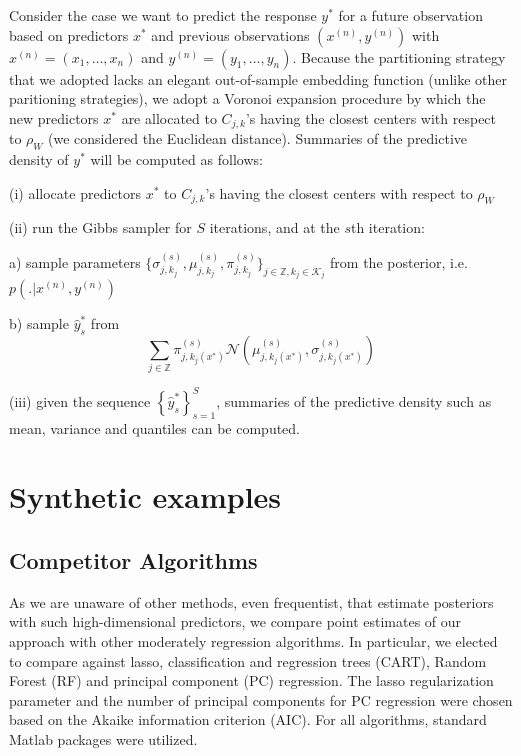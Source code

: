\documentclass{article} %
\providecommand{\mc}[1]{\mathcal{#1}}
\newcommand{\ZZ}{\mathbb{Z}}
\begin{document}
Consider the case we want to predict the response $y^{*}$ for a future observation based on predictors $x^{*}$ and previous observations $(x^{(n)},y^{(n)})$ with $x^{(n)}=(x_1,  \ldots, x_n)$ and $y^{(n)}=(y_1,  \ldots, y_n)$. Because the partitioning strategy that we adopted lacks an elegant out-of-sample embedding function (unlike other paritioning strategies), we adopt a Voronoi expansion procedure by which  the new predictors $x^{*}$ are allocated to $C_{j,k}$'s having the closest centers with respect to $\rho_W$ (we considered the Euclidean distance). Summaries of the predictive density of $y^{*}$ will be computed as follows:

(i) allocate predictors $x^{*}$ to $C_{j,k}$'s having the closest centers with respect to $\rho_W$

(ii) run the Gibbs sampler for $S$ iterations, and at the $s$th  iteration:

 \hspace{5pt} a) sample parameters $\{\sigma^{(s)}_{j,k_j}, \mu^{(s)}_{j,k_j}, \pi^{(s)}_{j,k_j} \}_{j\in\ZZ,k_j \in\mc{K}_j}$ from the posterior, i.e.  $p(.| x^{(n)},y^{(n)})$
   
 \hspace{5pt}   b) sample $\hat{y}^*_{s}$ from 
 $$ \sum_{j \in \ZZ} \pi^{(s)}_{j,k_j(x^{*})} \mc{N}\left(\mu^{(s)}_{j,k_j(x^{*})},\sigma^{(s)}_{j,k_j(x^{*})}\right)$$
   
 (iii) given the sequence $\left\lbrace  \hat{y}^*_{s}\right\rbrace_{s=1}^S$, summaries of the predictive density such as mean, variance and quantiles can be computed.



\section{Synthetic examples}
\subsection{Competitor Algorithms}

As we are unaware of other methods, even frequentist, that estimate posteriors with such high-dimensional predictors, we compare point estimates of our approach with other moderately regression algorithms.  In particular, we elected to compare against lasso, classification and regression trees (CART), Random Forest (RF) and principal component (PC) regression. The lasso regularization parameter and the number of principal components for PC regression were chosen based on  the Akaike information criterion (AIC). For all algorithms, standard Matlab packages were utilized. 
\end{document}
